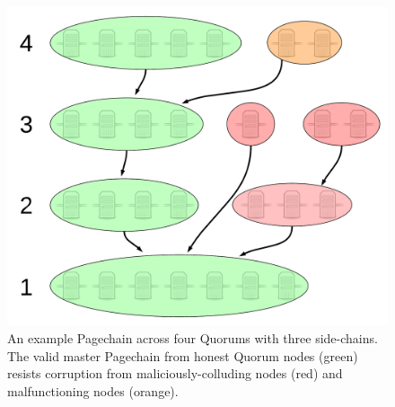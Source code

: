 \documentclass{sig-alternate}
\begin{document}

\begin{figure}[htbp]
	\centering
	\includegraphics[width=0.85\linewidth]{../images/LucidCharts/Page-chain2.pdf}
	\caption{An example Pagechain across four Quorums with three side-chains. The valid master Pagechain from honest Quorum nodes (green) resists corruption from maliciously-colluding nodes (red) and malfunctioning nodes (orange).}
	\label{fig:sideChains}
\end{figure}
\end{document}
